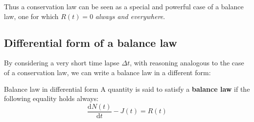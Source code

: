 \documentclass[a4paper,12pt,%
onecolumn,oneside,titlepage,%
british%
]{memoir}
\newcommand*{\di}{\mathrm{d}}%
\newcommand*{\incr}{\Delta}%
\renewcommand*{\|}[1][]{\nonscript\:#1\vert\nonscript\:\mathopen{}}
\newcommand*{\yN}{N}
\newcommand*{\yJ}{J}
\newcommand*{\yE}{E}
\newcommand*{\yH}{\varPhi}%
\newcommand*{\yR}{R}%
\newcommand*{\Dt}{\incr t}
\begin{document}
Thus a conservation law can be seen as a special and powerful case of a balance law, one for which $\yR(t)=0$ \emph{always and everywhere}.





\subsection{Differential form of a balance law}
\label{sec:balance_laws_diff}

By considering a very short time lapse $\Dt$, with reasoning analogous to the case of a conservation law, we can write a balance law in a different form:
\begin{definition}{Balance law in differential form}
  A quantity is said to satisfy a \textbf{balance law} if the following equality holds always:
  \begin{equation}
    \label{eq:conserved}
    \frac{\di\yN(t)}{\di t}- \yJ(t) = \yR(t)
  \end{equation}
\end{definition}
\end{document}
